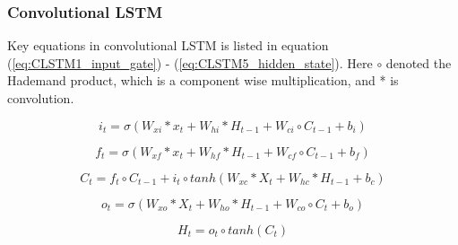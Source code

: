 \subsubsection{Convolutional LSTM}
\label{sec:conv_lstm}
Key equations in convolutional LSTM is listed in equation (\ref{eq:CLSTM1_input_gate}) - (\ref{eq:CLSTM5_hidden_state}). Here $\circ$ denoted the Hademand product, which is a component wise multiplication, and * is convolution. 


\begin{equation} \label{eq:CLSTM1_input_gate}
    i_t = \sigma \left( W_{xi}*x_t + W_{hi}*H_{t-1} + W_{ci}\circ C_{t-1}+b_i \right) 
\end{equation}

\begin{equation} \label{eq:CLSTM2_forget_gate}
        f_t = \sigma \left( W_{xf}*x_t + W_{hf}*H_{t-1} + W_{cf}\circ C_{t-1}+b_f \right) 
\end{equation}

\begin{equation} \label{eq:CLSTM3_cellstate}
        C_t = f_t \circ C_{t-1} +i_t\circ tanh\left( W_{xc}*X_t + W_{hc}*H_{t-1} + b_c \right)
\end{equation}

\begin{equation} \label{eq:CLSTM4_output_gate}
        o_t = \sigma \left( W_{xo}*X_t + W_{ho}*H_{t-1} + W_{co}\circ C_{t}+b_o \right)
\end{equation}

\begin{equation} \label{eq:CLSTM5_hidden_state}
        H_t = o_t \circ tanh \left( C_t \right)
\end{equation}




% 
